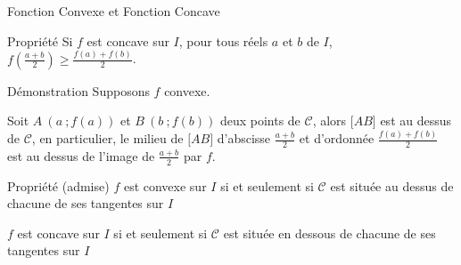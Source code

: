 \documentclass{cours}
\begin{document}
\begin{Gpartie}{Fonction Convexe et Fonction Concave}
\begin{Spartie}{Propriété}
            Si $f$ est concave sur $I$, pour tous réels $a$ et $b$ de $I$, $f\left(\frac{a+b}{2}\right)\geq\frac{f(a)+f(b)}{2}$.
            \begin{SSpartie}{Démonstration} 
                Supposons $f$ convexe.

                Soit $A~\left(a~;f(a)\right)$ et $B~\left(b~;f(b)\right)$ deux points de $\mathcal{C}$, alors $\big[AB\big]$ est au dessus de $\mathcal{C}$, en particulier, le milieu de $\big[AB\big]$ d'abscisse $\frac{a+b}{2}$ et d'ordonnée $\frac{f(a)+f(b)}{2}$ est au dessus de l'image de $\frac{a+b}{2}$ par $f$.
            \end{SSpartie}
        \end{Spartie}
        \begin{Spartie}{Propriété (admise)} 
            $f$ est convexe sur $I$ si et seulement si $\mathcal{C}$ est située au dessus de chacune de ses tangentes sur $I$

            $f$ est concave sur $I$ si et seulement si $\mathcal{C}$ est située en dessous de chacune de ses tangentes sur $I$

            \begin{center}
\end{center}
\end{Spartie}
\end{Gpartie}
\end{document}
